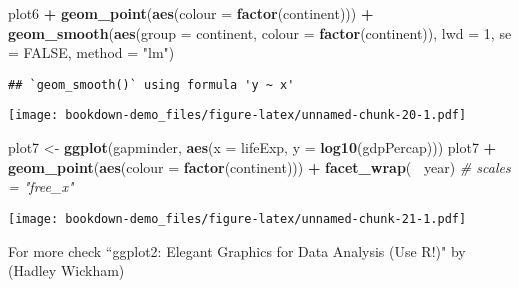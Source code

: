 \documentclass[
]{book}
\newenvironment{Shaded}{\begin{snugshade}}{\end{snugshade}}
\newcommand{\CommentTok}[1]{\textcolor[rgb]{0.56,0.35,0.01}{\textit{#1}}}
\newcommand{\DataTypeTok}[1]{\textcolor[rgb]{0.13,0.29,0.53}{#1}}
\newcommand{\DecValTok}[1]{\textcolor[rgb]{0.00,0.00,0.81}{#1}}
\newcommand{\KeywordTok}[1]{\textcolor[rgb]{0.13,0.29,0.53}{\textbf{#1}}}
\newcommand{\NormalTok}[1]{#1}
\newcommand{\OperatorTok}[1]{\textcolor[rgb]{0.81,0.36,0.00}{\textbf{#1}}}
\newcommand{\OtherTok}[1]{\textcolor[rgb]{0.56,0.35,0.01}{#1}}
\newcommand{\StringTok}[1]{\textcolor[rgb]{0.31,0.60,0.02}{#1}}
\begin{document}
\begin{Shaded}
\begin{Highlighting}[]
\NormalTok{plot6 }\OperatorTok{+}
\StringTok{  }\KeywordTok{geom_point}\NormalTok{(}\KeywordTok{aes}\NormalTok{(}\DataTypeTok{colour =} \KeywordTok{factor}\NormalTok{(continent))) }\OperatorTok{+}
\StringTok{  }\KeywordTok{geom_smooth}\NormalTok{(}\KeywordTok{aes}\NormalTok{(}\DataTypeTok{group =}\NormalTok{ continent, }\DataTypeTok{colour =} \KeywordTok{factor}\NormalTok{(continent)), }\DataTypeTok{lwd =} \DecValTok{1}\NormalTok{, }\DataTypeTok{se =} \OtherTok{FALSE}\NormalTok{, }\DataTypeTok{method =} \StringTok{"lm"}\NormalTok{)}
\end{Highlighting}
\end{Shaded}

\begin{verbatim}
## `geom_smooth()` using formula 'y ~ x'
\end{verbatim}

\texttt{[image: bookdown-demo\_files/figure-latex/unnamed-chunk-20-1.pdf]}

\begin{Shaded}
\begin{Highlighting}[]
\NormalTok{plot7 <-}\StringTok{ }\KeywordTok{ggplot}\NormalTok{(gapminder,}
                \KeywordTok{aes}\NormalTok{(}\DataTypeTok{x =}\NormalTok{ lifeExp, }\DataTypeTok{y =} \KeywordTok{log10}\NormalTok{(gdpPercap)))}
\NormalTok{plot7 }\OperatorTok{+}
\StringTok{  }\KeywordTok{geom_point}\NormalTok{(}\KeywordTok{aes}\NormalTok{(}\DataTypeTok{colour =} \KeywordTok{factor}\NormalTok{(continent))) }\OperatorTok{+}
\StringTok{  }\KeywordTok{facet_wrap}\NormalTok{(}\OperatorTok{~}\StringTok{ }\NormalTok{year) }\CommentTok{# scales = "free_x"}
\end{Highlighting}
\end{Shaded}

\texttt{[image: bookdown-demo\_files/figure-latex/unnamed-chunk-21-1.pdf]}

For more check ``ggplot2: Elegant Graphics for Data Analysis (Use R!)" by (Hadley Wickham)

  
\end{document}
